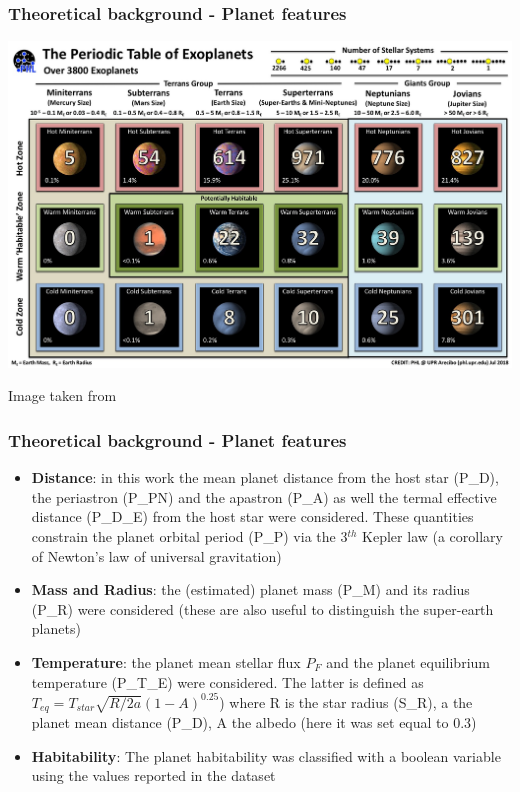 \documentclass[compress]{beamer}
\begin{document}
\begin{frame}
\frametitle{Theoretical background - Planet features }
\begin{center}
\includegraphics[width=.9\linewidth,]{Pic/PT_Confirmed.jpg}
\end{center}
\begin{center}
Image taken from \cite{exoplanets-catalog}
\end{center}
\end{frame}


\begin{frame}
\frametitle{Theoretical background - Planet features }
\begin{itemize}
\item\textbf{Distance}: in this work the mean planet distance from the host star (P\_D), the periastron (P\_PN) and the apastron (P\_A) as well the termal effective distance (P\_D\_E) from the host star  were considered. These quantities constrain the planet orbital period (P\_P) via the 3$^{th}$ Kepler law (a corollary of Newton's law of universal gravitation)
\item\textbf{Mass and Radius}: the (estimated) planet mass (P\_M) and its radius (P\_R) were considered (these are also useful to distinguish the super-earth planets) 
\item\textbf{Temperature}: the planet mean stellar flux $P_F$  and the planet equilibrium temperature (P\_T\_E) were considered. The latter is defined as $T_{eq}=T_{star}\sqrt{R/2a}\left(1-A\right)^{0.25}$) where R is the star radius (S\_R), a the planet mean distance (P\_D), A the albedo (here it was set equal to 0.3)
\item\textbf{Habitability}: The planet habitability was classified with a boolean variable using the values reported in the dataset \cite{planet_dataset}

\end{itemize}
\end{frame}
\end{document}
